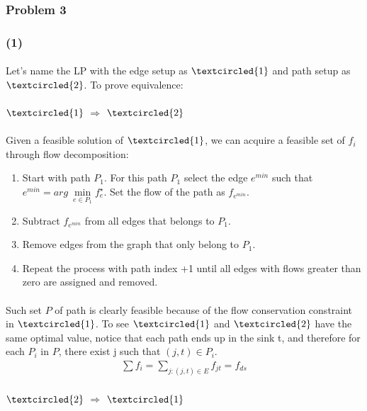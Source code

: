 \subsubsection*{Problem 3}
\subsubsection*{(1)}
\paragraph{}
Let's name the LP with the edge setup as $\textcircled{1}$ and path setup as $\textcircled{2}$. To prove equivalence:
\paragraph{}
$\textcircled{1}$ $\Rightarrow$ $\textcircled{2}$
\paragraph{}
Given a feasible solution of $\textcircled{1}$, we can acquire a feasible set of $f_i$ through flow decomposition:
\begin{enumerate}
	\item Start with path $P_1$. For this path $P_1$ select the edge $e^{min}$ such that $e^{min}=arg \ \underset{e\in P_1}{\min} f^{\star}_e$. Set the flow of the path as $f_{e^{min}}$.
	\item Subtract $f_{e^{min}}$ from all edges that belongs to $P_1$.
	\item Remove edges from the graph that only belong to $P_1$.
	\item Repeat the process with path index +1 until all edges with flows greater than zero are assigned and removed.
\end{enumerate}
\paragraph{}
Such set $P$ of path is clearly feasible because of the flow conservation constraint in $\textcircled{1}$. To see $\textcircled{1}$ and $\textcircled{2}$ have the same optimal value, notice that each path ends up in the sink t, and therefore for each $P_i$ in $P$, there exist j such that $(j, t) \in P_i$. 
\begin{align*}
\sum f_i = \underset{j:(j, t)\in E}{\sum}f_{jt} = f_{ds}
\end{align*}
\paragraph{}
$\textcircled{2}$ $\Rightarrow$ $\textcircled{1}$
